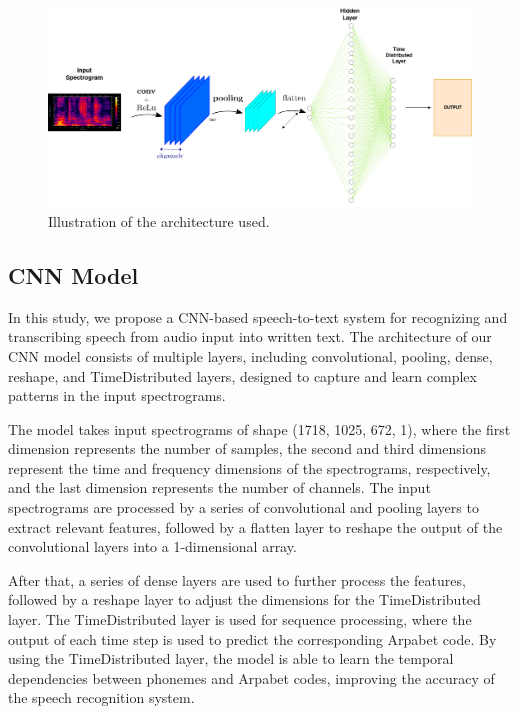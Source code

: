 \documentclass[12pt]{article}
\begin{document}
\begin{figure}[ht]
  \centering
  \includegraphics[width=.97\textwidth]{figures/Cnnarchitecture.png}
  \caption{Illustration of the architecture used.}
  \label{fig:overview_architecture}
\end{figure}

\subsection{CNN Model}

In this study, we propose a CNN-based speech-to-text system for recognizing and transcribing speech from audio input into written text. The architecture of our CNN model consists of multiple layers, including convolutional, pooling, dense, reshape, and TimeDistributed layers, designed to capture and learn complex patterns in the input spectrograms.

The model takes input spectrograms of shape (1718, 1025, 672, 1), where the first dimension represents the number of samples, the second and third dimensions represent the time and frequency dimensions of the spectrograms, respectively, and the last dimension represents the number of channels. The input spectrograms are processed by a series of convolutional and pooling layers to extract relevant features, followed by a flatten layer to reshape the output of the convolutional layers into a 1-dimensional array.

After that, a series of dense layers are used to further process the features, followed by a reshape layer to adjust the dimensions for the TimeDistributed layer. The TimeDistributed layer is used for sequence processing, where the output of each time step is used to predict the corresponding Arpabet code. By using the TimeDistributed layer, the model is able to learn the temporal dependencies between phonemes and Arpabet codes, improving the accuracy of the speech recognition system.
\end{document}
